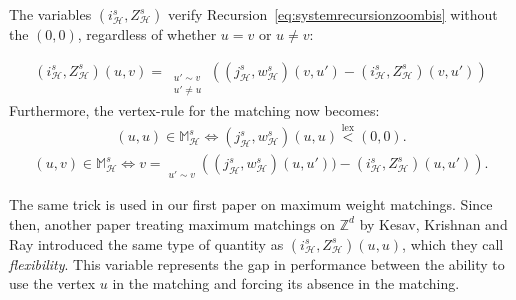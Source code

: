 \documentclass[11pt]{article}
\DeclareMathOperator{\lex}{lex}
\DeclareMathOperator*{\argmax}{argmax}
\DeclareMathOperator*{\argmaxlex}{\overset{\lex}{\argmax}}
\DeclareMathOperator*{\maxlex}{\overset{\lex}{\max}}
\begin{document}
The variables $(i_{\mathcal{H}}^s,Z_{\mathcal{H}}^s)$ verify Recursion~\ref{eq:systemrecursionzoombis} without the $(0,0)$, regardless of whether $u=v$ or $u \neq v$:

\begin{equation}\label{eq:recursionzoomselfloop}
    \begin{aligned}
        (i_{\mathcal{H}}^s,Z_{\mathcal{H}}^s)(u,v)= \maxlex_{\substack{ u' \sim v \\ u' \neq u}}\left( (j_{\mathcal{H}}^s,w_{\mathcal{H}}^s)(v,u')-(i_{\mathcal{H}}^s,Z_{\mathcal{H}}^s)(v,u') \right) 
    \end{aligned}
\end{equation}
Furthermore, the vertex-rule for the matching now becomes:
\begin{align}\label{eq:selflooprule}
    (u,u) \in \mathbb{M}_{\mathcal{H}}^s \Leftrightarrow  (j_{\mathcal{H}}^s,w_{\mathcal{H}}^s)(u,u) \overset{\lex}{<} (0,0).
\end{align}
\begin{align}\label{eq:vertexrule}
    (u,v) \in \mathbb{M}_{\mathcal{H}}^s \Leftrightarrow v=\underset{u' \sim v}{\argmaxlex}\left( (j_{\mathcal{H}}^s,w_{\mathcal{H}}^s)(u,u'))-(i_{\mathcal{H}}^s,Z_{\mathcal{H}}^s)(u,u') \right).
\end{align}

The same trick is used in our first paper \cite{enriquez2024optimalunimodularmatching} on maximum weight matchings. Since then, another paper treating maximum matchings on $\mathbb{Z}^d$ \cite{selfloopZd} by Kesav, Krishnan and Ray introduced the same type of quantity  as $(i_{\mathcal{H}}^s,Z_{\mathcal{H}}^s)(u,u)$, which they call \emph{flexibility}. This variable represents the gap in performance between the ability to use the vertex $u$ in the matching and forcing its absence in the matching.
\end{document}
